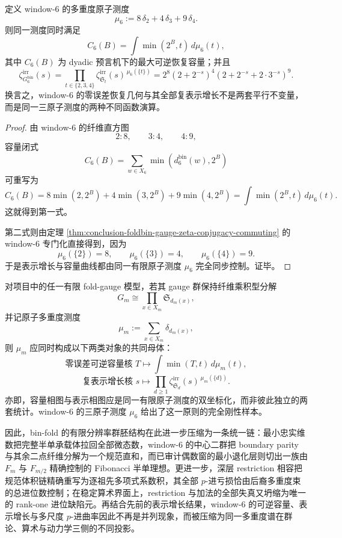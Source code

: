 \begin{theorem}\label{thm:conclusion-window6-threeatomic-measure-capacity-representation}
定义 window-\(6\) 的多重度原子测度
\[
\mu_6:=8\,\delta_2+4\,\delta_3+9\,\delta_4.
\]
则同一测度同时满足
\[
C_6(B)=\int \min(2^B,t)\,d\mu_6(t),
\]
其中 \(C_6(B)\) 为 dyadic 预言机下的最大可逆恢复容量；并且
\[
\zeta_{G_6^{\mathrm{bin}}}^{\mathrm{irr}}(s)
=
\prod_{t\in\{2,3,4\}}
\zeta_{\mathfrak S_t}^{\mathrm{irr}}(s)^{\,\mu_6(\{t\})}
=
2^8(2+2^{-s})^4(2+2^{-s}+2\cdot 3^{-s})^9.
\]
换言之，window-\(6\) 的零误差恢复几何与其全部复表示增长不是两套平行不变量，而是同一三原子测度的两种不同函数演算。
\end{theorem}
\begin{proof}
由 window-\(6\) 的纤维直方图
\[
2:8,\qquad 3:4,\qquad 4:9,
\]
容量闭式
\[
C_6(B)=\sum_{w\in X_6}\min(d_6^{\mathrm{bin}}(w),2^B)
\]
可重写为
\[
C_6(B)=8\min(2,2^B)+4\min(3,2^B)+9\min(4,2^B)
=
\int \min(2^B,t)\,d\mu_6(t).
\]
这就得到第一式。

第二式则由定理 \ref{thm:conclusion-foldbin-gauge-zeta-conjugacy-commuting} 的 window-\(6\) 专门化直接得到，因为
\[
\mu_6(\{2\})=8,\qquad
\mu_6(\{3\})=4,\qquad
\mu_6(\{4\})=9.
\]
于是表示增长与容量曲线都由同一有限原子测度 \(\mu_6\) 完全同步控制。证毕。
\end{proof}

\begin{conjecture}\label{conj:conclusion-foldbin-stieltjes-representation-rigidity}
对项目中的任一有限 fold-gauge 模型，若其 gauge 群保持纤维乘积型分解
\[
G_m\cong \prod_{x\in X_m}\mathfrak S_{d_m(x)},
\]
并记原子多重度测度
\[
\mu_m:=\sum_{x\in X_m}\delta_{d_m(x)},
\]
则 \(\mu_m\) 应同时构成以下两类对象的共同母体：
\[
\text{零误差可逆容量核 }T\longmapsto \int \min(T,t)\,d\mu_m(t),
\]
\[
\text{复表示增长核 }s\longmapsto \prod_{d\ge 1}\zeta_{\mathfrak S_d}^{\mathrm{irr}}(s)^{\,\mu_m(\{d\})}.
\]
亦即，容量相图与表示相图应是同一有限原子测度的双坐标化，而非彼此独立的两套统计。window-\(6\) 的三原子测度 \(\mu_6\) 给出了这一原则的完全刚性样本。
\end{conjecture}



\noindent
因此，bin-fold 的有限分辨率群胚结构在此进一步压缩为一条统一链：最小忠实维数把完整半单承载体拉回全部微态数，window-\(6\) 的中心二群把 boundary parity 与其余二点纤维分解为一个规范直和，而已审计偶数窗的最小退化层则切出一族由 \(F_m\) 与 \(F_{m/2}\) 精确控制的 Fibonacci 半单理想。更进一步，深层 restriction 相容把规范体积链精确重写为逐祖先多项式系数积，其全部 \(p\)-进亏损恰由后裔多重度束的总进位数控制；在稳定算术界面上，restriction 与加法的全部失真又坍缩为唯一的 rank-one 进位缺陷元。再结合先前的表示增长结果，window-\(6\) 的可逆容量、表示增长与多尺度 \(p\)-进曲率因此不再是并列现象，而被压缩为同一多重度谱在群论、算术与动力学三侧的不同投影。

\endinput
